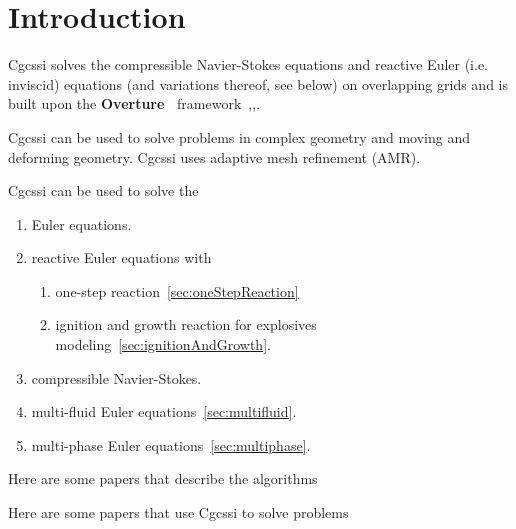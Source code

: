 \documentclass{article}
\newcommand{\Overture}{{\bf Over\-ture\ }}
\begin{document}
\clearpage
\tableofcontents

\vfill\eject


\section{Introduction}


Cgcssi solves the compressible Navier-Stokes equations and reactive Euler (i.e. inviscid) equations
(and variations thereof, see below)
on overlapping grids and is built upon the \Overture 
framework~\cite{Brown97},\cite{Henshaw96a},\cite{iscope97}. 

Cgcssi can be used to solve problems in complex geometry and moving and deforming
geometry. Cgcssi uses adaptive mesh refinement (AMR).

Cgcssi can be used to solve the
\begin{enumerate}
   \item Euler equations.
   \item reactive Euler equations with
      \begin{enumerate}
         \item one-step reaction~\ref{sec:oneStepReaction}
         \item ignition and growth reaction for explosives modeling~\ref{sec:ignitionAndGrowth}.
      \end{enumerate}
    \item compressible Navier-Stokes.
    \item multi-fluid Euler equations~\ref{sec:multifluid}.
    \item multi-phase Euler equations~\ref{sec:multiphase}.
\end{enumerate}

Here are some papers that describe the algorithms 
\begin{bibunit}[unsrt] %
\nocite{lrb2012a,mprxn2009,pog2008a,mfjwl2006,mog2006,reactamr2003b}
\end{bibunit}

Here are some papers that use Cgcssi to solve problems
\begin{bibunit}[unsrt] %
\nocite{hybridMultiphase2012a,fsi2012,OzlemSchwendemanKapilaHenshaw2012,SchwendemanKapilaHenshawLeeds2012,mprxn2009,fct2009,kapila2006,eliasson2007,mfrxn2007,mfjwl2006,ReedFriedHenshawTarver2006}
\end{bibunit}
\end{document}
